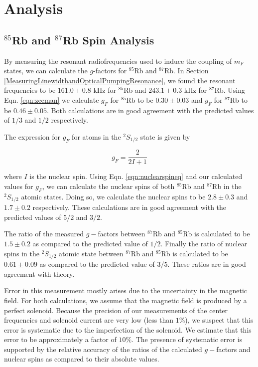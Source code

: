 
\section{Analysis}\label{analysis}

\subsection{$^{85}$Rb and $^{87}$Rb Spin Analysis}\label{SpinAnalysis}

By measuring the resonant radiofrequencies used to induce the coupling of $m_F$ states, we can calculate the $g$-factors for $^{85}$Rb and $^{87}$Rb.  In Section \ref{MeasuringLinewidthandOpticalPumpingResonance}, we found the resonant frequencies to be $161.0 \pm 0.8$ kHz for $^{85}$Rb and $243.1\pm 0.3$ kHz for $^{87}$Rb.  Using Eqn. \ref{eqn:zeeman} we calculate $g_F$ for $^{85}$Rb to be $0.30\pm 0.03$ and $g_F$ for $^{87}$Rb to be $0.46\pm 0.05$.  Both calculations are in good agreement with the predicted values of $1/3$ and $1/2$ respectively. 

The expression for $g_F$ for atoms in the $^{2}S_{1/2}$ state is given by
\begin{center}
\begin{equation}
g_F=\frac{2}{2I+1}\label{eqn:nuclearspineq}
\end{equation}
\end{center}
where $I$ is the nuclear spin. Using Eqn. \ref{eqn:nuclearspineq} and our calculated values for $g_F$, we can calculate the nuclear spins of both $^{85}$Rb and $^{87}$Rb in the $^{2}S_{1/2}$ atomic states.  Doing so, we calculate the nuclear spins to be $2.8 \pm 0.3$ and $1.7 \pm 0.2$ respectively.  These calculations are in good agreement with the predicted values of $5/2$ and $3/2$.  

The ratio of the measured $g-$factors between $^{87}$Rb and $^{85}$Rb is calculated to be $1.5 \pm 0.2$ as compared to the predicted value of $1/2$.  Finally the ratio of nuclear spins in the $^{2}S_{1/2}$ atomic state between $^{87}$Rb and $^{85}$Rb is calculated to be $0.61\pm 0.09$ as compared to the predicted value of $3/5$.  These ratios are in good agreement with theory.

Error in this measurement mostly arises due to the uncertainty in the magnetic field.  For both calculations, we assume that the magnetic field is produced by a perfect solenoid.  Because the precision of our measurements of the center frequencies and solenoid current are very low (less than $1\%$), we suspect that this error is systematic due to the imperfection of the solenoid.  We estimate that this error to be approximately a factor of $10\%$. The presence of systematic error is supported by the relative accuracy of the ratios of the calculated $g-$factors and nuclear spins as compared to their absolute values.  

